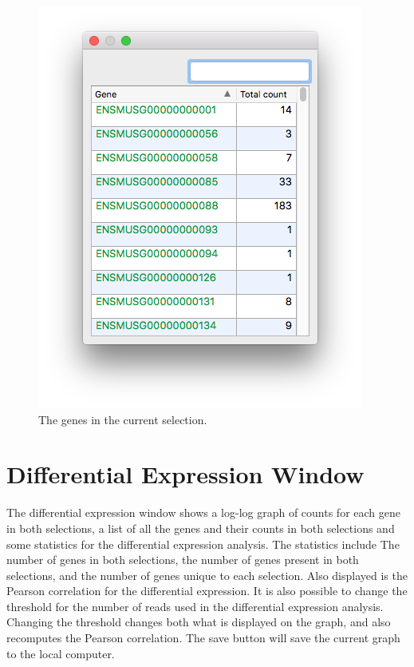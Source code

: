 \documentclass[10pt,a4paper,titlepage]{book}
\begin{document}
\begin{figure}[h]
	\centering
	\includegraphics[scale=0.5]{./Pictures/selection_gene_list}
	\caption{The genes in the current selection.}
	\label{fig:selection_gene_list}
\end{figure}

\clearpage

\section{Differential Expression Window}

The differential expression window shows a log-log graph of counts for each gene in both selections, a list of all the genes and their counts in both selections and some statistics for the differential expression analysis. The statistics include The number of genes in both selections, the number of genes present in both selections, and the number of genes unique to each selection. Also displayed is the Pearson correlation for the differential expression. It is also possible to change the threshold for the number of reads used in the differential expression analysis. Changing the threshold changes both what is displayed on the graph, and also recomputes the Pearson correlation. The save button will save the current graph to the local computer.
\end{document}
